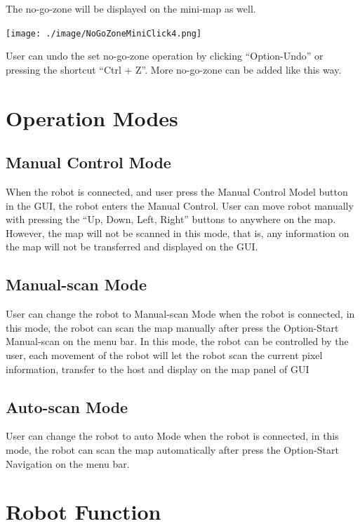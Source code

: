 \documentclass[11pt, a4paper]{report}
\begin{document}
The no-go-zone will be displayed on the mini-map as well. 

\begin{center}
\texttt{[image: ./image/NoGoZoneMiniClick4.png]}\\[1cm]
\end{center}

User can undo the set no-go-zone operation by clicking ``Option-Undo'' or pressing the shortcut ``Ctrl + Z''. More no-go-zone can be added like this way. 


\chapter {Operation Modes}

\section{Manual Control Mode}
When the robot is connected, and user press the Manual Control Model button in the GUI, the robot enters the Manual Control. User can move robot manually with pressing the ``Up, Down, Left, Right'' buttons to anywhere on the map. However, the map will not be scanned in this mode, that is, any information on the map will not be transferred and displayed on the GUI.

\section{Manual-scan Mode}
User can change the robot to Manual-scan Mode when the robot is connected, in this mode, the robot can scan the map manually after press the Option-Start Manual-scan on the menu bar. In this mode, the robot can be controlled by the user, each movement of the robot will let the robot scan the current pixel information, transfer to the host and display on the map panel of GUI

\section{Auto-scan Mode}
User can change the robot to auto Mode when the robot is connected, in this mode, the robot can scan the map automatically after press the Option-Start Navigation on the menu bar.









\chapter{Robot Function}
\end{document}
